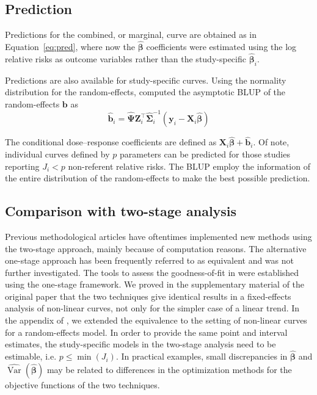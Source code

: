 \documentclass[11pt,a4paper,twoside,openany]{book}\usepackage{knitr}
\DeclareMathOperator{\Var}{Var}
\begin{document}
{{\subsection{Prediction}

Predictions for the combined, or marginal, curve are obtained as in Equation~\ref{eq:pred}, where now the $\boldsymbol{\hat \beta}$ coefficients were estimated using the log relative risks as outcome variables rather than the study-specific $\boldsymbol{\hat \beta}_i$. 

\noindent Predictions are also available for study-specific curves. Using the normality distribution for the random-effects, \cite{henderson1959estimation} computed the asymptotic BLUP of the random-effects $\boldsymbol{b}$ as
\begin{equation}
\hat {\mathbf{b}}_i = \hat{\boldsymbol{\Psi}} \mathbf{Z}_i^\top \hat{\boldsymbol{\Sigma}}_i^{-1}\left( \mathbf{y}_i - \mathbf{X}_i\hat{\boldsymbol{\beta}} \right)
\label{eq:blup_os}
\end{equation}

The conditional dose--response coefficients are defined as $\mathbf{X}_i\hat{\boldsymbol{\beta}} + \hat {\mathbf{b}}_i$. Of note, individual curves defined by $p$ parameters can be predicted for those studies reporting $J_i < p$ non-referent relative risks. The BLUP employ the information of the entire distribution of the random-effects to make the best possible prediction.

\subsection{Comparison with two-stage analysis}

Previous methodological articles have oftentimes implemented new methods using the two-stage approach, mainly because of computation reasons. The alternative one-stage approach has been frequently referred to as equivalent and was not further investigated. The tools to assess the goodness-of-fit in  were established using the one-stage framework. We proved in the supplementary material of the original paper that the two techniques give identical results in a fixed-effects analysis of non-linear curves, not only for the simpler case of a linear trend. In the appendix of , we extended the equivalence to the setting of non-linear curves for a random-effects model. In order to provide the same point and interval estimates, the study-specific models in the two-stage analysis need to be estimable, i.e. $p \le \min(J_i)$. In practical examples, small discrepancies in $\boldsymbol{\hat \beta}$ and $\widehat{\Var} \left( \boldsymbol{\hat \beta} \right)$ may be related to differences in the optimization methods for the objective functions of the two techniques.

}}
\end{document}
